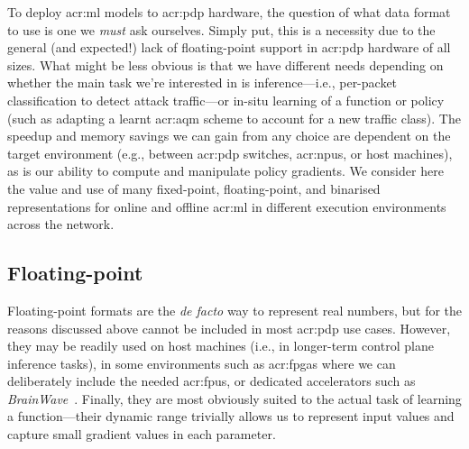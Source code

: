 To deploy \gls{acr:ml} models to \gls{acr:pdp} hardware, the question of what data format to use is one we \emph{must} ask ourselves.
Simply put, this is a necessity due to the general (and expected!) lack of floating-point support in \gls{acr:pdp} hardware of all sizes.
What might be less obvious is that we have different needs depending on whether the main task we're interested in is inference---i.e., per-packet classification to detect attack traffic---or in-situ learning of a function or policy (such as adapting a learnt \gls{acr:aqm} scheme to account for a new traffic class).
The speedup and memory savings we can gain from any choice are dependent on the target environment (e.g., between \gls{acr:pdp} switches, \glspl{acr:npu}, or host machines), as is our ability to compute and manipulate policy gradients.
We consider here the value and use of many fixed-point, floating-point, and binarised representations for online and offline \gls{acr:ml} in different execution environments across the network.

\subsection{Floating-point}
Floating-point formats are the \emph{de facto} way to represent real numbers, but for the reasons discussed above cannot be included in most \gls{acr:pdp} use cases.
However, they may be readily used on host machines (i.e., in longer-term control plane inference tasks), in some environments such as \glspl{acr:fpga} where we can deliberately include the needed \glspl{acr:fpu}, or dedicated accelerators such as \emph{BrainWave}~\parencite{DBLP:conf/isca/FowersOPMLLAHAG18}.
Finally, they are most obviously suited to the actual task of learning a function---their dynamic range trivially allows us to represent input values and capture small gradient values in each parameter.

